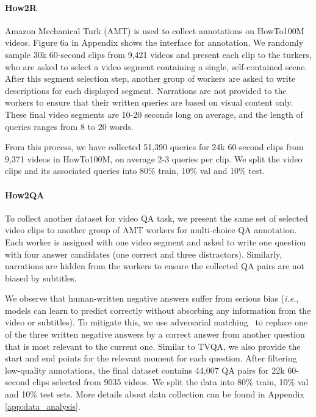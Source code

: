 \documentclass[11pt,a4paper]{article}
\begin{document}
\paragraph{How2R}
Amazon Mechanical Turk (AMT) is used to collect annotations on HowTo100M videos. Figure 6a in Appendix 
shows the interface for annotation. We randomly sample 30k 60-second clips from 9,421 videos and present each clip to the turkers, who are asked to select a video segment containing a single, self-contained scene. After this segment selection step, another group of workers are asked to write descriptions for each displayed segment. Narrations are not provided to the workers to ensure that their written queries are based on visual content only.  These final video segments are 10-20 seconds long on average, and the length of queries ranges from 8 to 20 words.
 
From this process, we have collected 51,390 queries for 24k 60-second clips from 9,371 videos in HowTo100M, on average 2-3 queries per clip. We split the video clips and its associated queries into 80\% train, 10\% val and 10\% test. 

\paragraph{How2QA}
To collect another dataset for video QA task, we present the same set of selected video clips to another group of AMT workers for multi-choice QA annotation. Each worker is assigned with one video segment and asked to write one question with four answer candidates (one correct and three distractors). Similarly, narrations are hidden from the workers to ensure the collected QA pairs are not biased by subtitles. 

We observe that human-written negative answers suffer from serious bias (\emph{i.e.}, models can learn to predict correctly without absorbing any information from the video or subtitles). To mitigate this, we use adversarial matching~\citep{zellers2019recognition} to replace one of the three written negative answers by a correct answer from another question that is most relevant to the current one. 
Similar to TVQA, we also provide the start and end points for the relevant moment for each question. After filtering low-quality annotations, the final dataset contains 44,007 QA pairs for 22k 60-second clips selected from 9035 videos.
We split the data into 80\% train, 10\% val and 10\% test sets. More details about data collection can be found in Appendix \ref{app:data_analysis}.
\end{document}
